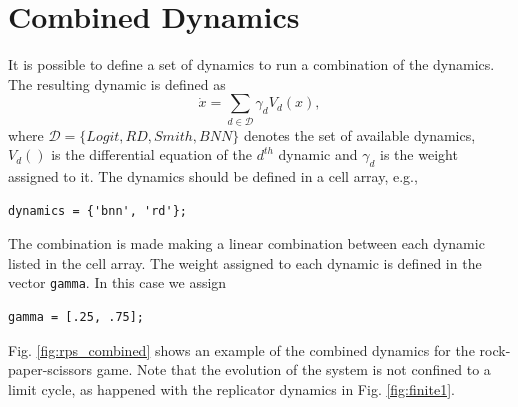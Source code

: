 \documentclass[a4paper,10pt]{article}
\def\th{^{th}}
\def\th{^{th}}
\begin{document}
 








 \FloatBarrier

\section{Combined Dynamics} \label{sec:combined}

It is possible to define a set of dynamics to run a combination of the dynamics. 
The resulting dynamic is defined as 
\begin{equation}
\dot{ x } = \sum_{d\in \mathcal{D}} \gamma_d V_d( x ),
\end{equation}
where $\mathcal{D}=\{ Logit, RD, Smith, BNN \}$ denotes the set of available dynamics, $V_d()$ is the differential equation of the $d\th$ dynamic and $\gamma_d$ is the weight assigned to it.
The dynamics should be defined in a cell array, e.g., 
\begin{lstlisting}
dynamics = {'bnn', 'rd'};
\end{lstlisting}
The combination is made making a linear combination between each dynamic listed in the cell array. The weight assigned to each dynamic is defined in the vector \verb|gamma|. In this case we assign 
\begin{lstlisting}
gamma = [.25, .75]; 
\end{lstlisting}

Fig. \ref{fig:rps_combined} shows an example of the combined dynamics for the rock-paper-scissors game. Note that the evolution of the system is not confined to a limit cycle, as happened with the replicator dynamics in Fig.  \ref{fig:finite1}.
\end{document}
